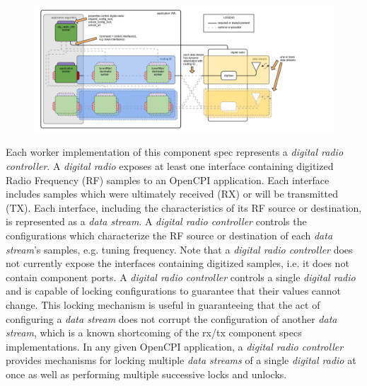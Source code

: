 \documentclass{article}
\begin{document}
    \begin{center}
      \begin{figure}[h]
        \centering\captionsetup{type=figure}\includegraphics[scale=0.42]{dig_radio_ctrlr}
        \label{fig:blockdiagram}
      \end{figure}
    \end{center}
    \noindent Each worker implementation of this component spec represents a
    \textit{digital radio controller}.
    A \textit{digital radio} exposes at least one interface containing digitized
    Radio Frequency (RF) samples to an OpenCPI application.
    Each interface includes samples which were ultimately received (RX) or will
    be transmitted (TX).
    Each interface, including the characteristics of its RF
    source or destination, is represented as a \textit{data stream}.
    A \textit{digital radio controller} controls the configurations which
    characterize the RF source or destination of each
    \textit{data stream}'s samples, e.g. tuning
    frequency.
    Note that a \textit{digital radio controller} does not currently expose the
    interfaces containing digitized samples, i.e. it does not contain
    component ports.
    A \textit{digital radio controller} controls a single
    \textit{digital radio} and is capable of locking configurations to guarantee
    that their values cannot change. This locking mechanism is useful in
    guaranteeing that the act of configuring a \textit{data stream}
    does not
    corrupt the configuration of another \textit{data stream}, which is a
    known
    shortcoming of the rx/tx component specs
    implementations\cite{rx_tx_comp_datasheet}.
    In any given OpenCPI application, a
    \textit{digital radio controller} provides mechanisms for locking multiple
    \textit{data streams} of a single \textit{digital radio} at once as well as
    performing multiple successive locks and unlocks.
\end{document}
